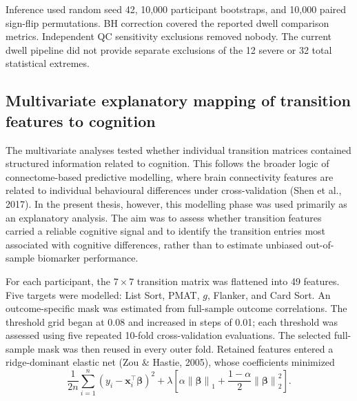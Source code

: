 \documentclass[12pt,a4paper]{report}
\begin{document}
Inference used random seed 42, 10,000 participant bootstraps, and 10,000 paired sign-flip permutations. BH correction covered the reported dwell comparison metrics. Independent QC sensitivity exclusions removed nobody. The current dwell pipeline did not provide separate exclusions of the 12 severe or 32 total statistical extremes.



\subsection{Multivariate explanatory mapping of transition features to cognition}
\label{sec:multivariate_explanatory_mapping}

The multivariate analyses tested whether individual transition matrices contained structured information related to cognition. This follows the broader logic of connectome-based predictive modelling, where brain connectivity features are related to individual behavioural differences under cross-validation (Shen et al., 2017). In the present thesis, however, this modelling phase was used primarily as an explanatory analysis. The aim was to assess whether transition features carried a reliable cognitive signal and to identify the transition entries most associated with cognitive differences, rather than to estimate unbiased out-of-sample biomarker performance.

For each participant, the $7 \times 7$ transition matrix was flattened into 49 features. Five targets were modelled: List Sort, PMAT, $g$, Flanker, and Card Sort. An outcome-specific mask was estimated from full-sample outcome correlations. The threshold grid began at 0.08 and increased in steps of 0.01; each threshold was assessed using five repeated 10-fold cross-validation evaluations. The selected full-sample mask was then reused in every outer fold. Retained features entered a ridge-dominant elastic net (Zou \& Hastie, 2005), whose coefficients minimized
\begin{equation}
\frac{1}{2n}
\sum_{i=1}^{n}
\left(y_i - \mathbf{x}_i^{\top}\boldsymbol{\beta}\right)^2
+
\lambda
\left[
\alpha \left\lVert \boldsymbol{\beta} \right\rVert_1
+
\frac{1-\alpha}{2}
\left\lVert \boldsymbol{\beta} \right\rVert_2^2
\right].
\end{equation}
\end{document}
